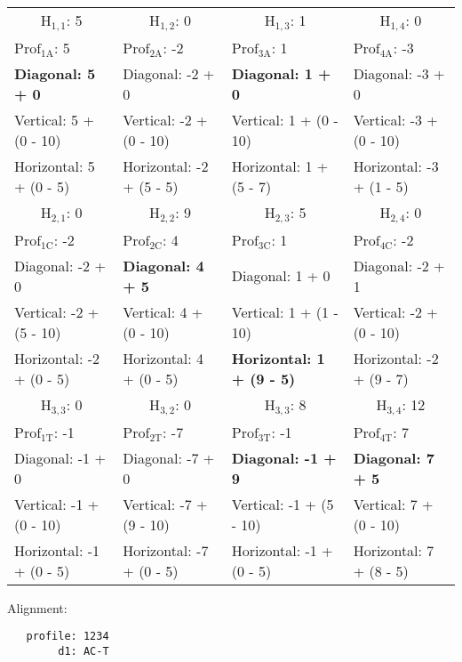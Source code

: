 \begin{table}[H]
\centering
\scriptsize
\begin{tabular}{|l|l|l|l|}
\hline
\multicolumn{1}{|c|}{$\mathrm{H}_{1,1}$: 5} & \multicolumn{1}{c|}{$\mathrm{H}_{1,2}$: 0} & \multicolumn{1}{c|}{$\mathrm{H}_{1,3}$: 1} & \multicolumn{1}{c|}{$\mathrm{H}_{1,4}$: 0}  \\
$\mathrm{Prof_{1A}}$: 5                     & $\mathrm{Prof_{2A}}$: -2                   & $\mathrm{Prof_{3A}}$: 1                    & $\mathrm{Prof_{4A}}$: -3                    \\
\textbf{Diagonal: 5 + 0}               & Diagonal: -2 + 0             & \textbf{Diagonal: 1 + 0}              & Diagonal: -3 + 0              \\
Vertical: 5 + (0 - 10)        & Vertical: -2 + (0 - 10)      & Vertical: 1 + (0 - 10)       & Vertical: -3 + (0 - 10)       \\
Horizontal: 5 + (0 - 5)       & Horizontal: -2 + (5 - 5)     & Horizontal: 1 + (5 - 7)      & Horizontal: -3 + (1 - 5)      \\ \hline
\multicolumn{1}{|c|}{$\mathrm{H}_{2,1}$: 0} & \multicolumn{1}{c|}{$\mathrm{H}_{2,2}$: 9} & \multicolumn{1}{c|}{$\mathrm{H}_{2,3}$: 5} & \multicolumn{1}{c|}{$\mathrm{H}_{2,4}$: 0}  \\
$\mathrm{Prof_{1C}}$: -2                    & $\mathrm{Prof_{2C}}$: 4                    & $\mathrm{Prof_{3C}}$: 1                    & $\mathrm{Prof_{4C}}$: -2                    \\
Diagonal: -2 + 0              & \textbf{Diagonal: 4 + 5}              & Diagonal: 1 + 0              & Diagonal: -2 + 1              \\
Vertical: -2 + (5 - 10)       & Vertical: 4 + (0 - 10)       & Vertical: 1 + (1 - 10)       & Vertical: -2 + (0 - 10)       \\
Horizontal: -2 + (0 - 5)      & Horizontal: 4 + (0 - 5)      & \textbf{Horizontal: 1 + (9 - 5)}      & Horizontal: -2 + (9 - 7)      \\ \hline
\multicolumn{1}{|c|}{$\mathrm{H}_{3,3}$: 0} & \multicolumn{1}{c|}{$\mathrm{H}_{3,2}$: 0} & \multicolumn{1}{c|}{$\mathrm{H}_{3,3}$: 8} & \multicolumn{1}{c|}{$\mathrm{H}_{3,4}$: 12} \\
$\mathrm{Prof_{1T}}$: -1                    & $\mathrm{Prof_{2T}}$: -7                   & $\mathrm{Prof_{3T}}$: -1                   & $\mathrm{Prof_{4T}}$: 7                     \\
Diagonal: -1 + 0              & Diagonal: -7 + 0             & \textbf{Diagonal: -1 + 9}             & \textbf{Diagonal: 7 + 5}               \\
Vertical: -1 + (0 - 10)       & Vertical: -7 + (9 - 10)      & Vertical: -1 + (5 - 10)      & Vertical: 7 + (0 - 10)        \\
Horizontal: -1 + (0 - 5)      & Horizontal: -7 + (0 - 5)     & Horizontal: -1 + (0 - 5)     & Horizontal: 7 + (8 - 5)       \\ \hline
\end{tabular}
\end{table}

\noindent
Alignment:
\begin{verbatim}
   profile: 1234
        d1: AC-T
\end{verbatim}

\bigskip 

%
